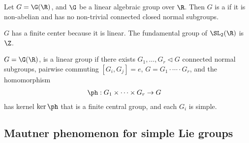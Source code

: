 \begin{df}
Let $G=\G(\R)$, and $\G$ be a linear algebraic group over $\R$. Then $G$ is a  if it is non-abelian and has no non-trivial connected closed normal subgroups.
\end{df}
\begin{rem}
$G$ has a finite center because it is linear. The fundamental group of $\SL_2(\R)$ is $\Z$. 
\end{rem}
\begin{df}
 $G=\G(\R)$, %
is a  linear group  if there 
exists $G_1,\ldots, G_r\triangleleft G$ connected normal subgroups, pairwise commuting $[G_i,G_j]=e$, $G=G_1\cdot \cdots \cdot G_r$, and the homomorphism
\begin{align}
\ph:G_1\times \cdots \times G_r &\to G
\end{align}
has kernel $\ker \ph$ that is a finite central group, and each $G_i$ is simple. 
\end{df}

\subsection{Mautner phenomenon for simple Lie groups}

